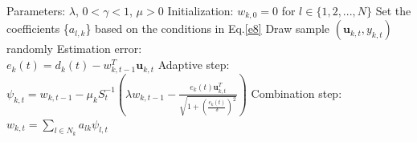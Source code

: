 

	\begin{algorithm}
	\caption{The ATC form of RDSGD algorithm}\label{Alg_RDSGD}
	\begin{algorithmic}
		\State Parameters: $\lambda$, $0<\gamma<1$, $\mu>0$
		\State Initialization: $ w_{k,0}=0$ for $l\in\{1,2,...,N\}$
		\State Set the coefficients \{$a_{l,k}$\} based on the conditions in Eq.\ref{e8}
				\State Draw sample $(\textbf{u}_{k,t},y_{k,t})$ randomly
				\State Estimation error: \\\qquad$e_k(t)=d_k(t)-w_{k,t-1}^T\textbf{u}_{k,t}$
				\State Adaptive step: \\\qquad$\psi_{k,t}=w_{k,t-1}-\mu_k S_t^{-1}\left(\lambda w_{k,t-1}-\frac{e_k(t)\textbf{u}_{k,t}^T}{\sqrt{1+(\frac{e_k(t)}{\delta})^2}}\right)$
				\State Combination step: \\\qquad$w_{k,t}=\sum_{l\in N_k}a_{lk}\psi_{l,t}$
			\EndFor
		\EndFor
	\end{algorithmic}
\end{algorithm}